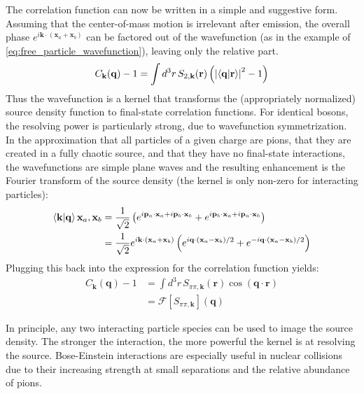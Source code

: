 The correlation function can now be written in a simple and suggestive form.
Assuming that the center-of-mass motion is irrelevant after emission, the overall phase $e^{i\mathbf{k}\cdot(\mathbf{x}_a+\mathbf{x}_b)}$ can be factored out of the wavefunction (as in the example of \cref{eq:free_particle_wavefunction}), leaving only the relative part.
\begin{equation} \label{eq:wavefunction_kernel}
C_\mathbf{k}(\mathbf{q}) - 1 = \int d^3 r \, S_{2,\mathbf{k}}(\mathbf{r}) \left(\left|\braket{\mathbf{q}|\mathbf{r}}\right|^2 - 1 \right)
\end{equation}
Thus the wavefunction is a kernel that transforms the (appropriately normalized) source density function to final-state correlation functions.
For identical bosons, the resolving power is particularly strong, due to wavefunction symmetrization.
In the approximation that all particles of a given charge are pions, that they are created in a fully chaotic source, and that they have no final-state interactions, the wavefunctions are simple plane waves and the resulting enhancement is the Fourier transform of the source density (the kernel is only non-zero for interacting particles):
\begin{align}
\braket{\mathbf{k}|\mathbf{q}}{\mathbf{x}_a, \mathbf{x}_b} &= \frac{1}{\sqrt{2}}\left(e^{i\mathbf{p}_a \cdot \mathbf{x}_a + i\mathbf{p}_b \cdot \mathbf{x}_b} + e^{i\mathbf{p}_b \cdot \mathbf{x}_a + i\mathbf{p}_a \cdot \mathbf{x}_b}\right)\\
&= \frac{1}{\sqrt{2}}e^{i\mathbf{k} \cdot (\mathbf{x}_a+ \mathbf{x}_b)}\left(e^{i\mathbf{q} \cdot (\mathbf{x}_a - \mathbf{x}_b)/2} + e^{- i\mathbf{q} \cdot (\mathbf{x}_a - \mathbf{x}_b)/2}\right) \label{eq:free_particle_wavefunction}
\end{align}
Plugging this back into the expression for the correlation function yields:
\begin{align}
C_{\mathbf{k}}(\mathbf{q}) - 1 &= \int d^3 r \, S_{\pi\pi,\mathbf{k}}(\mathbf{r}) \cos\left(\mathbf{q}\cdot\mathbf{r}\right)
\\&= \mathcal{F}\left[{S}_{\pi\pi,\mathbf{k}}\right] (\mathbf{q})
\end{align}

In principle, any two interacting particle species can be used to image the source density.
The stronger the interaction, the more powerful the kernel is at resolving the source.
Bose-Einstein interactions are especially useful in nuclear collisions due to their increasing strength at small separations and the relative abundance of pions.

